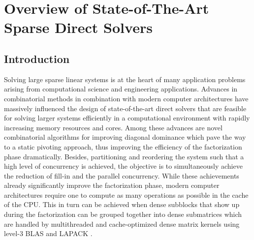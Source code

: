 \chapter{Overview of State-of-The-Art Sparse Direct Solvers}

\section{Introduction}
\label{sec:intro}
Solving large sparse linear systems is at the heart of many application
problems arising from computational science and engineering applications.
Advances in combinatorial
methods in combination with modern computer architectures have massively
influenced the design of state-of-the-art direct solvers
that are feasible for solving  larger systems efficiently
in a computational environment with rapidly increasing memory resources
and cores. Among these advances are 
novel combinatorial algorithms for improving diagonal dominance which
pave the way to a static pivoting approach, thus improving the 
efficiency of the factorization
phase dramatically. Besides, partitioning and reordering the system
such that a high level of concurrency is achieved, the objective is to 
simultaneously achieve the reduction of fill-in and the parallel concurrency.
While these achievements already significantly improve the factorization
phase, modern computer architectures require one to compute as many operations
as possible in the cache of the CPU. This in turn can be achieved when
dense subblocks that show up during the factorization can be grouped
together into dense submatrices which are handled
by multithreaded and cache-optimized 
dense matrix kernels using level-3 BLAS and LAPACK
\cite{AndBBDDDGHMOS95}.

